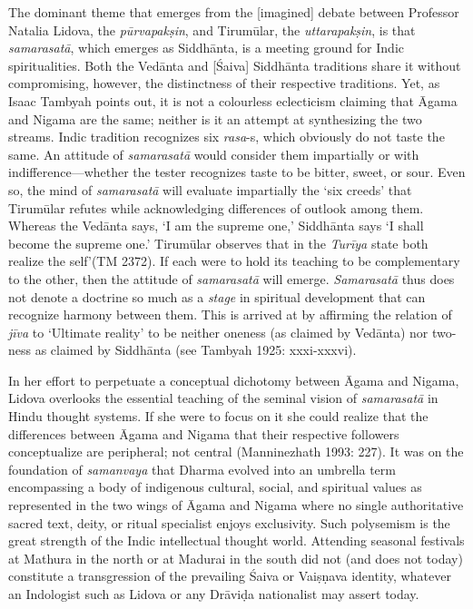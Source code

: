 The dominant theme that emerges from the [imagined] debate between Professor Natalia Lidova, the \textit{pūrvapakṣin}, and Tirumūlar, the \textit{uttarapakṣin}, is that \textit{samarasatā}, which emerges as Siddhānta, is a meeting ground for Indic spiritualities. Both the Vedānta and [Śaiva] Siddhānta traditions share it without compromising, however, the distinctness of their respective traditions. Yet, as Isaac Tambyah points out, it is not a colourless eclecticism claiming that Āgama and Nigama are the same; neither is it an attempt at synthesizing the two streams. Indic tradition recognizes six \textit{rasa}-s, which obviously do not taste the same. An attitude of \textit{samarasatā} would consider them impartially or with indifference—whether the tester recognizes taste to be bitter, sweet, or sour. Even so, the mind of \textit{samarasatā} will evaluate impartially the ‘six creeds’ that Tirumūlar refutes while acknowledging differences of outlook among them. Whereas the Vedānta says, ‘I am the supreme one,’ Siddhānta says ‘I shall become the supreme one.’ Tirumūlar observes that in the \textit{Turīya} state both realize the self’(TM 2372). If each were to hold its teaching to be complementary to the other, then the attitude of \textit{samarasatā} will emerge. \textit{Samarasatā} thus does not denote a doctrine so much as a \textit{stage} in spiritual development that can recognize harmony between them. This is arrived at by affirming the relation of \textit{jīva} to ‘Ultimate reality’ to be neither oneness (as claimed by Vedānta) nor two-ness as claimed by Siddhānta (see Tambyah 1925: xxxi-xxxvi).

In her effort to perpetuate a conceptual dichotomy between Āgama and Nigama, Lidova overlooks the essential teaching of the seminal vision of \textit{samarasatā} in Hindu thought systems. If she were to focus on it she could realize that the differences between Āgama and Nigama that their respective followers conceptualize are peripheral; not central (Manninezhath 1993: 227). It was on the foundation of \textit{samanvaya} that Dharma evolved into an umbrella term encompassing a body of indigenous cultural, social, and spiritual values as represented in the two wings of Āgama and Nigama where no single authoritative sacred text, deity, or ritual specialist enjoys exclusivity. Such polysemism is the great strength of the Indic intellectual thought world. Attending seasonal festivals at Mathura in the north or at Madurai in the south did not (and does not today) constitute a transgression of the prevailing Śaiva or Vaiṣṇava identity, whatever an Indologist such as Lidova or any Drāviḍa nationalist may assert today.

